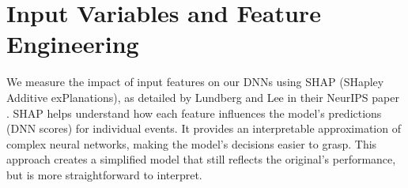 
\section{Input Variables and Feature Engineering}
\label{input_variables}

We measure the impact of input features on our DNNs using SHAP (SHapley Additive exPlanations), as detailed by Lundberg and Lee in their NeurIPS paper \cite{LundbergLee2017}. SHAP helps understand how each feature influences the model's predictions (DNN scores) for individual events. It provides an interpretable approximation of complex neural networks, making the model's decisions easier to grasp. This approach creates a simplified model that still reflects the original's performance, but is more straightforward to interpret.


